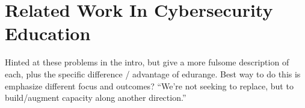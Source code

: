 \section*{Related Work In Cybersecurity Education}

Hinted at these problems in the intro, but give a more fulsome
description of each, plus the specific difference / advantage of
edurange. Best way to do this is emphasize different focus and
outcomes? ``We're not seeking to replace, but to build/augment
capacity along another direction.''
